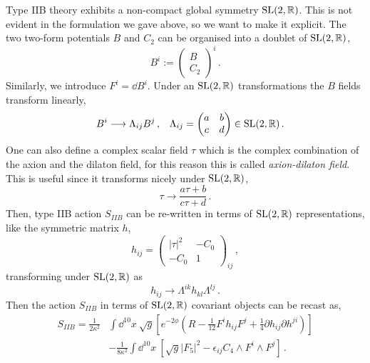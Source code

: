 \documentclass[debug]{phd}
\begin{document}
				Type IIB theory exhibits a non-compact global symmetry $\mathrm{SL}(2, \mathbb{R})$.
				This is not evident in the formulation we gave above, so we want to make it explicit.
				The two two-form potentials $B$ and $C_2$ can be organised into a doublet of $\mathrm{SL}(2, \mathbb{R})$,
						\begin{equation}
							B^i := \begin{pmatrix}
									B \\
									C_2
							\end{pmatrix}^i \, .
						\end{equation}
				Similarly, we introduce $F^i = \dd B^i$.
				Under an $\mathrm{SL}(2,\mathbb{R})$ transformations the $B$ fields transform linearly,
						\begin{align}
							& &	B^i \longrightarrow \Lambda_{ij} B^j \, ,	& &	\Lambda_{ij} = \begin{pmatrix}
																					a & b \\
																					c & d					
																				\end{pmatrix} \in \mathrm{SL}(2, \mathbb{R}) \, . 
						\end{align}
				One can also define a complex scalar field $\tau$ which is the complex combination of the axion and the dilaton field, for this reason this is called \emph{axion-dilaton field}.
				This is useful since it transforms nicely under $\mathrm{SL}(2,\mathbb{R})$,
						\begin{equation}
							\tau \longrightarrow \frac{a \tau + b}{c \tau + d} \, .
						\end{equation}
				Then, type IIB action $S_{IIB}$ can be re-written in terms of $\mathrm{SL}(2,\mathbb{R})$ representations, like the symmetric matrix $h$,
						\begin{equation}
							h_{ij} = \begin{pmatrix}
								\lvert \tau \rvert^2 & -C_0 \\
								-C_0 & 1
							\end{pmatrix}_{ij} \, ,
						\end{equation} 
				transforming under $\mathrm{SL}(2, \mathbb{R})$ as
						\begin{equation}
							h_{ij} \longrightarrow \Lambda^{ik} h_{kl} \Lambda^{lj} \, .
						\end{equation}
				Then the action $S_{IIB}$ in terms of $\mathrm{SL}(2, \mathbb{R})$ covariant objects can be recast as,
						\begin{equation}
							\begin{split}
								S_{IIB} = \frac{1}{2\kappa^2}& \int \dd^{10} x \ \sqrt{g} \left[e^{-2\phi} \left(R - \frac{1}{12}F^i h_{ij} F^j + \frac{1}{4} \partial h_{ij} \partial h^{ji} \right)\right] \\
											& - \frac{1}{8 \kappa^2}\int \dd^{10} x \ \left[ \sqrt{g} \lvert F_{5} \rvert^2 - \epsilon_{ij} C_4 \wedge F^i \wedge F^j \right] \, .
							\end{split}
						\end{equation}
\end{document}
